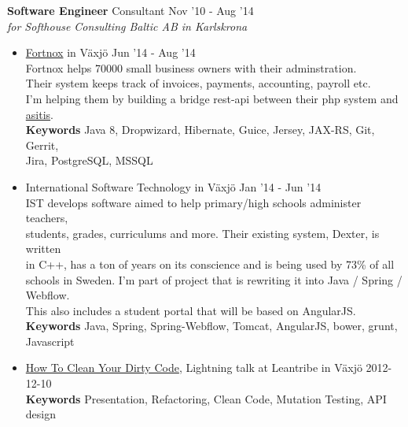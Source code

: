 \documentclass[overlapped]{res}
\begin{document}
\begin{resume}
{\bf Software Engineer} Consultant \hfill Nov '10 - Aug '14 \\
{\sl for Softhouse Consulting Baltic AB in Karlskrona}
\begin{itemize}
\itemsep -1pt
\item \href{http://www.fortnox.se/}{Fortnox} in Växjö \hfill Jun '14 - Aug '14
\\Fortnox helps 70000 small business owners with their adminstration. 
\\Their system keeps track of invoices, payments, accounting, payroll etc. 
\\I'm helping them by building a bridge rest-api between their php system and \href{http://asitis.se/en/}{asitis}.
\\{\bf Keywords} Java 8, Dropwizard, Hibernate, Guice, Jersey, JAX-RS, Git, Gerrit, 
\\Jira, PostgreSQL, MSSQL
\\
\itemsep -1pt
\item International Software Technology in Växjö \hfill Jan '14 - Jun '14
\\IST develops software aimed to help primary/high schools administer teachers, 
\\students, grades, curriculums and more. Their existing system, Dexter, is written
\\in C++, has a ton of years on its conscience and is being used by 73\% of all\\ schools in Sweden. I'm part of project that is rewriting it into Java / Spring / Webflow. 
\\This also includes a student portal that will be based on AngularJS.
\\{\bf Keywords} Java, Spring, Spring-Webflow, Tomcat, AngularJS, bower, grunt, Javascript
\\
\item \href{http://www.youtube.com/watch?v=htalgZCFWMI}{How To Clean Your Dirty Code}, Lightning talk at Leantribe in Växjö \hfill 2012-12-10
	\\{\bf Keywords} Presentation, Refactoring, Clean Code, Mutation Testing, API design


\end{itemize}
\end{resume}
\end{document}
